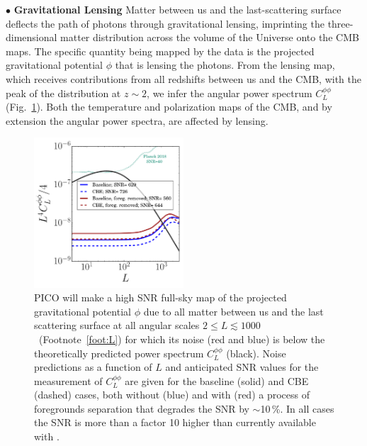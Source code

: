 \documentclass[PICOAPC.tex]{subfiles}
\begin{document}
\noindent$\bullet$ {\bf Gravitational Lensing} \hspace{0.1in} \label{lensing} Matter between us and the last-scattering surface deflects the path of photons through gravitational lensing, imprinting the three-dimensional matter distribution across the volume of the Universe onto the CMB maps. The specific quantity being mapped by the data is the projected gravitational potential $\phi$ that is lensing the photons. From the lensing map, which receives contributions from all redshifts between us and the CMB, with the peak of the distribution at $z \sim 2$, we infer the angular power spectrum $C_{L}^{\phi \phi}$ (Fig.~\ref{fig:lensingNoisePICO}). Both the temperature and polarization maps of the CMB, and by extension the angular power spectra, are affected by lensing. 
\begin{figure}[h]
\hspace{-0.2in}
\parbox{3.0in}{\centerline {
\includegraphics[width=2.2in]{images/lensingNoisePICO_w_planck.pdf} } }
\hspace{0.in}
\parbox{3.3in}{
\caption{\captiontext 
PICO will make a high \ac{SNR} full-sky map of the projected gravitational potential $\phi$ due to all matter between us and the last scattering surface at all angular scales $2 \leq L \lesssim 1000$~(Footnote~\ref{foot:L}) for which its noise (red and blue) is below the 
theoretically predicted power spectrum $C_{L}^{\phi \phi}$ (black). Noise predictions as a function of $L$ and anticipated \ac{SNR} values for the measurement of  $C_{L}^{\phi \phi}$ are given for the baseline (solid) and CBE (dashed) cases, both without (blue) and with (red) a process of foregrounds separation that degrades the \ac{SNR} by $\sim$10\,\%.  In all cases the \ac{SNR} is more than a factor 10 higher than currently available with \planck .
\label{fig:lensingNoisePICO} } }
\vspace{-0.1in}
\end{figure}
\end{document}
